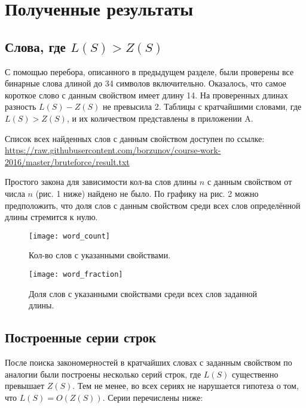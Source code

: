\section{Полученные результаты}

\subsection{Слова, где $ L(S) > Z(S) $}

С помощью перебора, описанного в предыдущем разделе, были проверены все бинарные слова длиной до 34 символов включительно. Оказалось, что самое короткое слово с данным свойством имеет длину 14. На проверенных длинах разность $ L(S) - Z(S) $ не превысила 2. Таблицы с кратчайшими словами, где $ L(S) > Z(S) $, и их количеством представлены в приложении A.

Список всех найденных слов с данным свойством доступен по ссылке: \linebreak
\url{https://raw.githubusercontent.com/borzunov/course-work-2016/master/bruteforce/result.txt}

Простого закона для зависимости кол-ва слов длины $n$ с данным свойством от числа $n$ (рис. 1 ниже) найдено не было. По графику на рис. 2 можно предположить, что доля слов с данным свойством среди всех слов определённой длины стремится к нулю.

\begin{figure}[h!]
\begin{center}
\begin{minipage}[h]{0.49\linewidth}
\texttt{[image: word\_count]}
\caption{Кол-во слов с указанными свойствами.}
\label{pic:word_count}
\end{minipage}
\hfill 
\begin{minipage}[h]{0.49\linewidth}
\texttt{[image: word\_fraction]}
\caption{Доля слов с указанными свойствами среди всех слов заданной длины.}
\label{pic:word_fraction}
\end{minipage}
\end{center}
\end{figure}

\subsection{Построенные серии строк}

После поиска закономерностей в кратчайших словах с заданным свойством по аналогии были построены несколько серий строк, где $ L(S) $ существенно превышает $ Z(S) $. Тем не менее, во всех сериях не нарушается гипотеза о том, что $ L(S) = O( Z(S) ) $. Серии перечислены ниже:


